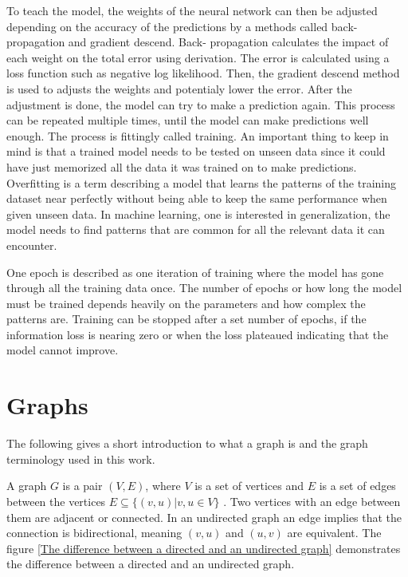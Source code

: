 To teach the model, the weights of the neural network can then be adjusted depending on the accuracy of the predictions by a methods called back-propagation and gradient descend. Back- propagation calculates the impact of each weight on the total error using derivation. The error is calculated using a loss function such as negative log likelihood. Then, the gradient descend method is used to adjusts the weights and potentialy lower the error. After the adjustment is done, the model can try to make a prediction again. This process can be repeated multiple times, until the model can make predictions well enough. The process is fittingly called training. An important thing to keep in mind is that a trained model needs to be tested on unseen data since it could have just memorized all the data it was trained on to make predictions. Overfitting is a term describing a model that learns the patterns of the training dataset near perfectly without being able to keep the same performance when given unseen data. In machine learning, one is interested in generalization, the model needs to find patterns that are common for all the relevant data it can encounter.

One epoch is described as one iteration of training where the model has gone through all the training data once. The number of epochs or how long the model must be trained depends heavily on the parameters and how complex the patterns are. Training can be stopped after a set number of epochs, if the information loss is nearing zero or when the loss plateaued indicating that the model cannot improve.

\section{Graphs}

The following gives a short introduction to what a graph is and the graph terminology used in this work.

A graph $G$ is a pair $(V,E)$, where $V$ is a set of vertices and $E$ is a set of edges between the vertices $E \subseteq \{(v,u) |  v,u \in V\}$ \cite{graphdef}. Two vertices with an edge between them are adjacent or connected. In an undirected graph an edge implies that the connection is bidirectional, meaning $(v,u)$ and $(u,v)$ are equivalent. The figure \ref{The difference between a directed and an undirected graph} demonstrates the difference between a directed and an undirected graph.

